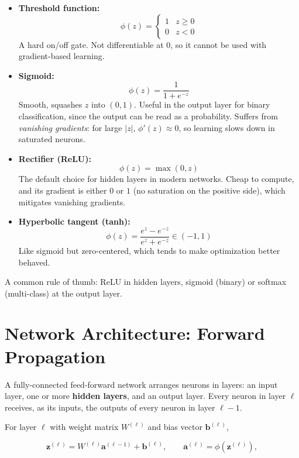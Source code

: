 \documentclass[11pt]{article}
\begin{document}
\begin{itemize}
  \item \textbf{Threshold function:}
        \[
          \phi(z) = \begin{cases} 1 & z \ge 0 \\ 0 & z < 0 \end{cases}
        \]
        A hard on/off gate. Not differentiable at $0$, so it cannot be
        used with gradient-based learning.

  \item \textbf{Sigmoid:}
        \[
          \phi(z) = \frac{1}{1 + e^{-z}}
        \]
        Smooth, squashes $z$ into $(0, 1)$. Useful in the output layer for
        binary classification, since the output can be read as a
        probability. Suffers from \emph{vanishing gradients}: for large
        $|z|$, $\phi'(z) \approx 0$, so learning slows down in saturated
        neurons.

  \item \textbf{Rectifier (ReLU):}
        \[
          \phi(z) = \max(0, z)
        \]
        The default choice for hidden layers in modern networks. Cheap to
        compute, and its gradient is either $0$ or $1$ (no saturation on
        the positive side), which mitigates vanishing gradients.

  \item \textbf{Hyperbolic tangent (tanh):}
        \[
          \phi(z) = \frac{e^z - e^{-z}}{e^z + e^{-z}} \in (-1, 1)
        \]
        Like sigmoid but zero-centered, which tends to make optimization
        better behaved.
\end{itemize}

A common rule of thumb: ReLU in hidden layers, sigmoid (binary) or softmax
(multi-class) at the output layer.

\section{Network Architecture: Forward Propagation}

A fully-connected feed-forward network arranges neurons in layers: an
input layer, one or more \textbf{hidden layers}, and an output layer.
Every neuron in layer $\ell$ receives, as its inputs, the outputs of every
neuron in layer $\ell - 1$.

For layer $\ell$ with weight matrix $W^{(\ell)}$ and bias vector
$\mathbf{b}^{(\ell)}$,

\[
  \mathbf{z}^{(\ell)} = W^{(\ell)} \mathbf{a}^{(\ell-1)} + \mathbf{b}^{(\ell)},
  \qquad
  \mathbf{a}^{(\ell)} = \phi\!\left(\mathbf{z}^{(\ell)}\right),
\]
\end{document}
